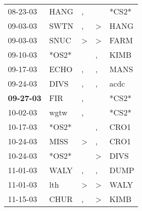\begin{supertabular}{p{0.07\textwidth}p{0.06\textwidth}p{0.02\textwidth}p{0.02\textwidth}p{0.06\textwidth}}
          08-23-03\textsuperscript{} &           HANG\textsuperscript{} &                , &                  &                            *CS2* \\
          09-03-03\textsuperscript{} &           SWTN\textsuperscript{} &                , &     \textgreater &           HANG\textsuperscript{} \\
          09-03-03\textsuperscript{} &           SNUC\textsuperscript{} &     \textgreater &     \textgreater &           FARM\textsuperscript{} \\
          09-10-03\textsuperscript{} &                            *OS2* &                  &                , &           KIMB\textsuperscript{} \\
          09-17-03\textsuperscript{} &           ECHO\textsuperscript{} &                , &                , &           MANS\textsuperscript{} \\
          09-24-03\textsuperscript{} &           DIVS\textsuperscript{} &                , &                , &           acdc\textsuperscript{} \\
 \textbf{09-27-03\textsuperscript{}} &            FIR\textsuperscript{} &                , &                  &                            *CS2* \\
          10-02-03\textsuperscript{} &           wgtw\textsuperscript{} &                , &                  &                            *CS2* \\
          10-17-03\textsuperscript{} &                            *OS2* &                  &                , &           CRO1\textsuperscript{} \\
          10-24-03\textsuperscript{} &           MISS\textsuperscript{} &     \textgreater &                , &           CRO1\textsuperscript{} \\
          10-24-03\textsuperscript{} &                            *OS2* &                  &     \textgreater &           DIVS\textsuperscript{} \\
          11-01-03\textsuperscript{} &           WALY\textsuperscript{} &                , &                , &           DUMP\textsuperscript{} \\
          11-01-03\textsuperscript{} &            lth\textsuperscript{} &     \textgreater &     \textgreater &           WALY\textsuperscript{} \\
          11-15-03\textsuperscript{} &           CHUR\textsuperscript{} &                , &     \textgreater &           KIMB\textsuperscript{} \\

\end{supertabular}
